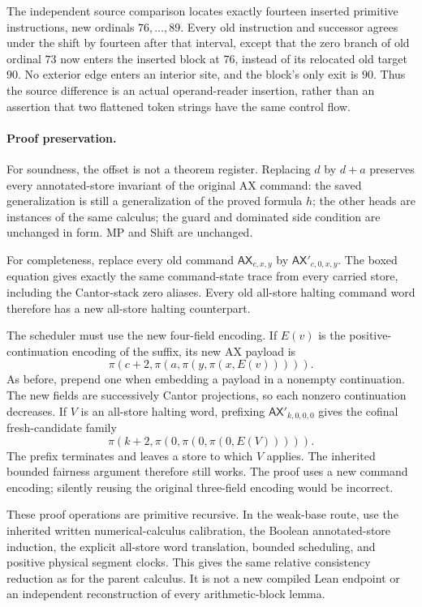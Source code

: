 The independent source comparison locates exactly fourteen inserted
primitive instructions, new ordinals \(76,\ldots,89\).  Every old
instruction and successor agrees under the shift by fourteen after
that interval, except that the zero branch of old ordinal \(73\)
now enters the inserted block at \(76\), instead of its relocated
old target \(90\).  No exterior edge enters an interior site, and
the block's only exit is \(90\).
Thus the source difference is an actual operand-reader insertion,
rather than an assertion that two flattened token strings have the
same control flow.

\paragraph{Proof preservation.}
For soundness, the offset is not a theorem register.  Replacing \(d\)
by \(d+a\) preserves every annotated-store invariant of the original
AX command: the saved generalization is still a generalization of
the proved formula \(h\); the other heads are instances of the
same calculus; the guard and dominated side condition are unchanged
in form.  MP and Shift are unchanged.

For completeness, replace every old command
\(\mathsf{AX}_{c,x,y}\) by
\(\mathsf{AX}'_{c,0,x,y}\).  The boxed equation gives exactly the
same command-state trace from every carried store, including the
Cantor-stack zero aliases.  Every old all-store halting command word
therefore has a new all-store halting counterpart.

The scheduler must use the new four-field encoding.  If \(E(v)\)
is the positive-continuation encoding of the suffix, its new AX
payload is
\[
 \pi(c+2,\pi(a,\pi(y,\pi(x,E(v))))).
\]
As before, prepend one when embedding a payload in a nonempty
continuation.  The new fields are successively Cantor projections,
so each nonzero continuation decreases.  If \(V\) is an all-store
halting word, prefixing \(\mathsf{AX}'_{k,0,0,0}\) gives the cofinal
fresh-candidate family
\[
 \pi(k+2,\pi(0,\pi(0,\pi(0,E(V))))).
\]
The prefix terminates and leaves a store to which \(V\) applies.
The inherited bounded fairness argument therefore still works.
The proof uses a new command encoding; silently reusing the original
three-field encoding would be incorrect.

These proof operations are primitive recursive.  In the weak-base
route, use the inherited written numerical-calculus calibration,
the Boolean annotated-store induction, the explicit all-store word
translation, bounded scheduling, and positive physical segment clocks.
This gives the same relative consistency reduction as for the
parent calculus.  It is not a new compiled Lean endpoint or an
independent reconstruction of every arithmetic-block lemma.

